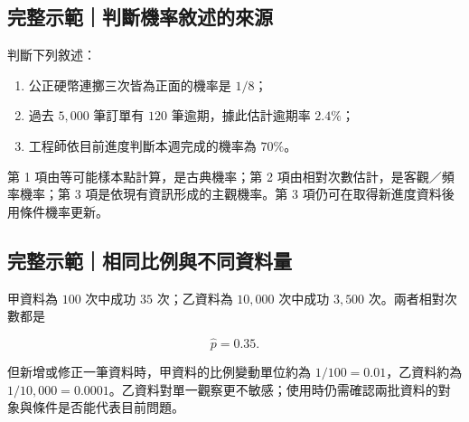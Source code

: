 \documentclass[11pt,a4paper]{article}
\providecommand{\tightlist}{%
  \setlength{\itemsep}{0pt}\setlength{\parskip}{0pt}}
\begin{document}
\begin{HandoutWorkedExample}

\subsection{完整示範｜判斷機率敘述的來源}\label{ux5b8cux6574ux793aux7bc4ux5224ux65b7ux6a5fux7387ux6558ux8ff0ux7684ux4f86ux6e90}

判斷下列敘述：

\begin{enumerate}
\def\labelenumi{\arabic{enumi}.}
\tightlist
\item
  公正硬幣連擲三次皆為正面的機率是 \(1/8\)；
\item
  過去 \(5{,}000\) 筆訂單有 \(120\) 筆逾期，據此估計逾期率 \(2.4\%\)；
\item
  工程師依目前進度判斷本週完成的機率為 \(70\%\)。
\end{enumerate}

第 1 項由等可能樣本點計算，是古典機率；第 2 項由相對次數估計，是客觀／頻率機率；第 3 項是依現有資訊形成的主觀機率。第 3 項仍可在取得新進度資料後用條件機率更新。

\end{HandoutWorkedExample}

\begin{HandoutWorkedExample}

\subsection{完整示範｜相同比例與不同資料量}\label{ux5b8cux6574ux793aux7bc4ux76f8ux540cux6bd4ux4f8bux8207ux4e0dux540cux8cc7ux6599ux91cf}

甲資料為 \(100\) 次中成功 \(35\) 次；乙資料為 \(10{,}000\) 次中成功 \(3{,}500\) 次。兩者相對次數都是

\[
\hat p=0.35.
\]

但新增或修正一筆資料時，甲資料的比例變動單位約為 \(1/100=0.01\)，乙資料約為 \(1/10{,}000=0.0001\)。乙資料對單一觀察更不敏感；使用時仍需確認兩批資料的對象與條件是否能代表目前問題。

\end{HandoutWorkedExample}
\end{document}
